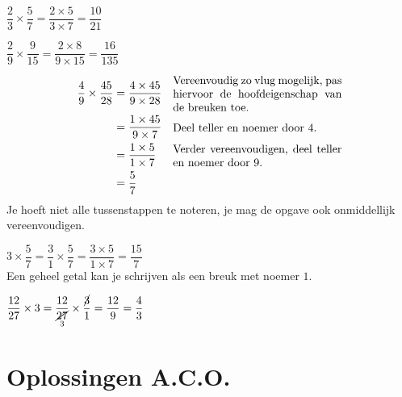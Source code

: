 \documentclass[12pt]{article}
\begin{document}
\begin{voorbeeld}
$\dfrac{2}{3}\times\dfrac{5}{7}=\dfrac{2\times 5}{3\times 7}=\dfrac{10}{21}$
\end{voorbeeld}

\begin{voorbeeld}
$\dfrac{2}{9}\times\dfrac{9}{15}=\dfrac{2\times 8}{9\times 15}=\dfrac{16}{135}$
\end{voorbeeld}

\begin{voorbeeld}
\vspace*{-1cm}
\begin{align*}
  \dfrac{4}{9}\times\dfrac{45}{28} &= \dfrac{4\times 45}{9 \times 28} & \parbox{15em}{Vereenvoudig zo vlug mogelijk, pas hiervoor de hoofdeigenschap van de breuken toe.}\\
                                    &= \dfrac{1\times 45}{9 \times 7} & \parbox{15em}{Deel teller en noemer door 4.}\\
                                    &= \dfrac{1\times 5}{1 \times 7} & \parbox{15em}{Verder vereenvoudigen, deel teller en noemer door 9.}\\
                                    &= \dfrac{5}{7}\\
\end{align*}
Je hoeft niet alle tussenstappen te noteren, je mag de opgave ook onmiddellijk vereenvoudigen.
\end{voorbeeld}

\begin{voorbeeld}
$3\times\dfrac{5}{7}=\dfrac{3}{1}\times\dfrac{5}{7}=\dfrac{3\times 5}{1\times 7}=\dfrac{15}{7}$\\
Een geheel getal kan je schrijven als een breuk met noemer $1$.
\end{voorbeeld}

\begin{voorbeeld}
$\dfrac{12}{27}\times 3=\dfrac{12}{\underset{3}{\cancel{27}}}\times\dfrac{\cancel{3}}{1}=\dfrac{12}{9}=\dfrac{4}{3}$\\
\end{voorbeeld}



\newpage

\begin{exercise}
\end{exercise}

\begin{solution}
\end{solution}

\begin{onthoud}
\begin{itemize}
\end{itemize}
\end{onthoud}

\newpage
\section*{Oplossingen A.C.O.}

\immediate\closeout\solutionstream

\end{document}
